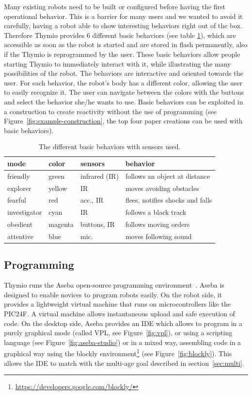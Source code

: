 \documentclass[letterpaper, 10 pt, conference]{ieeeconf}  %
\begin{document}
Many existing robots need to be built or configured before having the first operational behavior. 
This is a barrier for many users and we wanted to avoid it carefully, having a robot able to show interesting behaviors right out of the box.
Therefore Thymio provides 6 different basic behaviors (see table \ref{tbl:basic-behaviors}), which are accessible as soon as the robot is started and are stored in flash permanently, also if the Thymio is reprogrammed by the user.
These basic behaviors allow people starting Thymio to immediately interact with it, while illustrating the many possibilities of the robot.
The behaviors are interactive and oriented towards the user. %
For each behavior, the robot's body has a different color, allowing the user to easily recognize it.
The user can navigate between the colors with the buttons and select the behavior she/he wants to use.
Basic behaviors can be exploited in a construction to create reactivity without the use of programming (see Figure~\ref{fig:example-construction}, the top four paper creations can be used with basic behaviors).

\begin{table}
\begin{tabularx}{\columnwidth}{@{}llll@{}}
\toprule
mode & color & sensors & behavior \\
\midrule
friendly & green & infrared (IR) & follows an object at distance \\
explorer & yellow & IR & moves avoiding obstacles \\
fearful & red & acc., IR & flees, notifies shocks and falls \\
investigator & cyan & IR & follows a black track \\
obedient & magenta & buttons, IR & follows moving orders \\
attentive & blue & mic. & moves following sound \\
\bottomrule
\end{tabularx}
\caption{The different basic behaviors with sensors used.}
\label{tbl:basic-behaviors}
\end{table}


\subsection{Programming}
\label{sec:aseba}

Thymio runs the Aseba open-source programming environment~\cite{aseba}.
Aseba is designed to enable novices to program robots easily.
On the robot side, it provides a lightweight virtual machine that runs on microcontrollers like the PIC24F.
A virtual machine allows instantaneous upload and safe execution of code.
On the desktop side, Aseba provides an IDE which allows to program in a purely graphical mode (called VPL, see Figure~\ref{fig:vpl}), or using a scripting language (see Figure~\ref{fig:aseba-studio}) or in a mixed way, assembling code in a graphical way using the blockly environment\footnote{\url{https://developers.google.com/blockly/}} (see Figure~\ref{fig:blockly}).
This allows the IDE to match with the multi-age goal described in section~\ref{sec:multi}.
\end{document}
